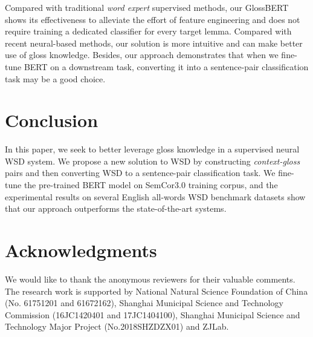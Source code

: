\documentclass[11pt,a4paper]{article}
\begin{document}
Compared with traditional \textit{word expert} supervised methods, our GlossBERT shows its effectiveness to alleviate the effort of feature engineering and does not require training a dedicated classifier for every target lemma. 
Compared with recent neural-based methods, our solution is more intuitive and can make better use of gloss knowledge. Besides, our approach demonstrates that when we fine-tune BERT on a downstream task, converting it into a sentence-pair classification task may be a good choice.


\section{Conclusion}
In this paper, we seek to better leverage gloss knowledge in a supervised neural WSD system. We propose a new solution to WSD by constructing \textit{context-gloss} pairs and then converting WSD to a sentence-pair classification task. We fine-tune the pre-trained BERT model on SemCor3.0 training corpus, and the experimental results on several English all-words WSD benchmark datasets show that our approach outperforms the state-of-the-art systems.





\section*{Acknowledgments}
We would like to thank the anonymous reviewers for their valuable comments. The research work is supported by National Natural Science Foundation of China (No. 61751201 and 61672162),
Shanghai Municipal Science and Technology Commission (16JC1420401 and 17JC1404100), Shanghai Municipal Science and Technology Major Project (No.2018SHZDZX01) and ZJLab.



\end{document}
